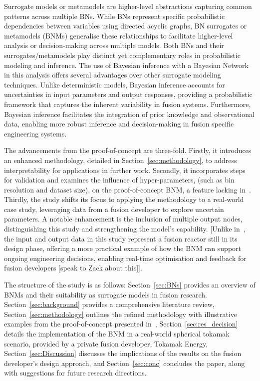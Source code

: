 \documentclass[journal]{IEEEtran}
\begin{document}
Surrogate models or metamodels are higher-level abstractions capturing common patterns across multiple BNs. While BNs represent specific probabilistic dependencies between variables using directed acyclic graphs, BN surrogates or metamodels (BNMs) generalise these relationships to facilitate higher-level analysis or decision-making across multiple models. Both BNs and their surrogates/metamodels play distinct yet complementary roles in probabilistic modeling and inference. The use of Bayesian inference with a Bayesian Network in this analysis offers several advantages over other surrogate modeling techniques. Unlike deterministic models, Bayesian inference accounts for uncertainties in input parameters and output responses, providing a probabilistic framework that captures the inherent variability in fusion systems. Furthermore, Bayesian inference facilitates the integration of prior knowledge and observational data, enabling more robust inference and decision-making in fusion specific engineering systems.

The advancements from the proof-of-concept are three-fold. Firstly, it introduces an enhanced methodology, detailed in Section~\ref{sec:methodology}, to address interpretability for applications in further work. Secondly, it incorporates steps for validation and examines the influence of hyper-parameters, (such as bin resolution and dataset size), on the proof-of-concept BNM, a feature lacking in~\cite{Griffiths2024}. Thirdly, the study shifts its focus to applying the methodology to a real-world case study, leveraging data from a fusion developer to explore uncertain parameters. A notable enhancement is the inclusion of multiple output nodes, distinguishing this study and strengthening the model's capability. [Unlike in~\cite{Griffiths2024}, the input and output data in this study represent a fusion reactor still in its design phase, offering a more practical example of how the BNM can support ongoing engineering decisions, enabling real-time optimisation and feedback for fusion developers [speak to Zack about this]].

The structure of the study is as follows: Section~\ref{sec:BNs} provides an overview of BNMs and their suitability as surrogate models in fusion research. Section~\ref{sec:background} provides a comprehensive literature review, Section~\ref{sec:methodology} outlines the refined methodology with illustrative examples from the proof-of-concept presented in~\cite{Griffiths2024}, Section~\ref{sec:res_decision} details the implementation of the BNM in a real-world spherical tokamak scenario, provided by a private fusion developer, Tokamak Energy, Section~\ref{sec:Discussion} discusses the implications of the results on the fusion developer's design approach, and Section~\ref{sec:conc} concludes the paper, along with suggestions for future research directions.
\end{document}
